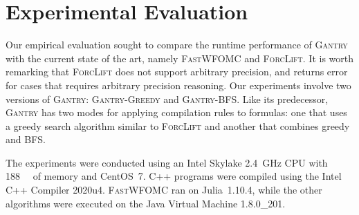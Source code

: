 \documentclass[a4paper,UKenglish,cleveref, autoref, thm-restate]{lipics-v2021}
\newcommand{\Cranetwo}{\textsc{Gantry}}
\newcommand{\Cranebfs}{\textsc{Gantry-BFS}}
\newcommand{\Cranegreedy}{\textsc{Gantry-Greedy}}
\begin{document}
\section{Experimental Evaluation}\label{sec:experiments}





Our empirical evaluation sought to compare the runtime performance of
{\Cranetwo} with the current state of the art, namely \textsc{FastWFOMC} and
\textsc{ForcLift}. It is worth remarking that \textsc{ForcLift} does not support
arbitrary precision, and returns error for cases that requires arbitrary
precision reasoning. Our experiments involve two versions of \Cranetwo{}:
\Cranegreedy{} and \Cranebfs{}. Like its predecessor, \Cranetwo{} has two modes
for applying compilation rules to formulas: one that uses a greedy search
algorithm similar to \textsc{ForcLift} and another that combines greedy and
BFS\@.

The experiments were conducted using an Intel Skylake \SI{2.4}{\giga\hertz} CPU
with \SI{188}{\gibi\byte} of memory and CentOS~7. C++ programs were compiled
using the Intel C++ Compiler 2020u4. \textsc{FastWFOMC} ran on Julia~1.10.4,
while the other algorithms were executed on the Java Virtual Machine 1.8.0\_201.



\end{document}
